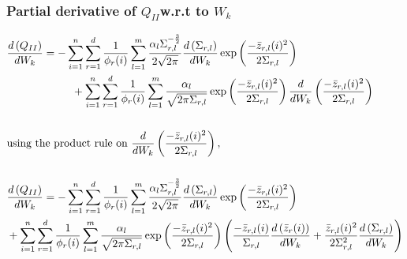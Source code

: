 \documentclass[]{article}
\begin{document}
\subsubsection*{Partial derivative of $Q_{II}$w.r.t to $W_k$}
\begin{align*}
&\der{W_k}{Q_{II}}=-\sum\limits_{i=1}^n \sum\limits_{r=1}^{d}\frac{1}{\phi_r(i)} \sum\limits_{l=1}^{m} \frac{\alpha_l \Sigma^{-\frac{3}{2}}_{r,l}}{2\sqrt{2\pi}} \der{W_k}{\Sigma_{r,l}} \exp\left( \frac{-\bar{z}_{r,l}(i)^2} {2\Sigma_{r,l}}\right)  \\
&\qquad \qquad \qquad +\sum\limits_{i=1}^n \sum\limits_{r=1}^{d}\frac{1}{\phi_r(i)} \sum\limits_{l=1}^{m} \frac{\alpha_l}{\sqrt{2\pi\Sigma_{r,l}}} \exp\left( \frac{-\bar{z}_{r,l}(i)^2}{2\Sigma_{r,l}}\right) \frac{d}{dW_k}\left( \frac{-\bar{z}_{r,l}(i)^2}{2\Sigma_{r,l}}\right) \\ \\
& \text{using the product rule on } \frac{d}{dW_k}\left( \frac{-\bar{z}_{r,l}(i)^2}{2\Sigma_{r,l}}\right), \\ \\
&\der{W_k}{Q_{II}}=-\sum\limits_{i=1}^n \sum\limits_{r=1}^{d}\frac{1}{\phi_r(i)} \sum\limits_{l=1}^{m} \frac{\alpha_l \Sigma^{-\frac{3}{2}}_{r,l}}{2\sqrt{2\pi}} \der{W_k}{\Sigma_{r,l}} \exp\left( \frac{-\bar{z}_{r,l}(i)^2} {2\Sigma_{r,l}}\right)  \\
& +\sum\limits_{i=1}^n \sum\limits_{r=1}^{d}\frac{1}{\phi_r(i)} \sum\limits_{l=1}^{m} \frac{\alpha_l}{\sqrt{2\pi\Sigma_{r,l}}} \exp\left( \frac{-\bar{z}_{r,l}(i)^2}{2\Sigma_{r,l}}\right) \left( \frac{-\bar{z}_{r,l}(i)}{\Sigma_{r,l}}\der{W_k}{\bar{z}_r(i)} + \frac{\bar{z}_{r,l}(i)^2} {2\Sigma_{r,l}^2}\der{W_k}{\Sigma_{r,l}} \right)
\end{align*}
\end{document}

